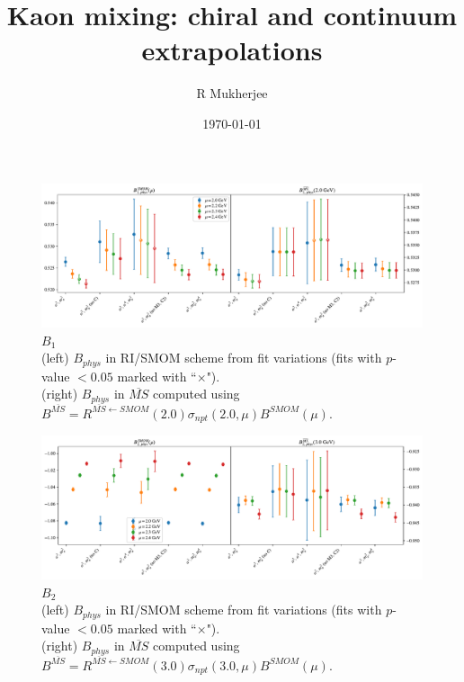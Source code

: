 \documentclass[12pt]{extarticle}
\title{Kaon mixing: chiral and continuum extrapolations}
\author{R Mukherjee}
\date{\today}
\begin{document}
\maketitle
\tableofcontents
\clearpage
\begin{figure}
\centering
\includegraphics[page=1, width=1.1\textwidth]{VVpAA/NPR/fit_summary.pdf}
\caption{$B_{1}$\\(left) $B_{phys}$ in RI/SMOM scheme from fit variations (fits with $p$-value $<0.05$ marked with ``$\times$"). \\(right) $B_{phys}$ in $\overline{MS}$ computed using $B^{\overline{MS}} = R^{\overline{MS}\leftarrow SMOM}(2.0)\sigma_{npt}(2.0,\mu) B^{SMOM}(\mu)$.}
\end{figure}
\clearpage
\begin{figure}
\centering
\includegraphics[page=1, width=1.1\textwidth]{VVmAA/NPR/fit_summary.pdf}
\caption{$B_{2}$\\(left) $B_{phys}$ in RI/SMOM scheme from fit variations (fits with $p$-value $<0.05$ marked with ``$\times$"). \\(right) $B_{phys}$ in $\overline{MS}$ computed using $B^{\overline{MS}} = R^{\overline{MS}\leftarrow SMOM}(3.0)\sigma_{npt}(3.0,\mu) B^{SMOM}(\mu)$.}
\end{figure}
\clearpage
\end{document}
